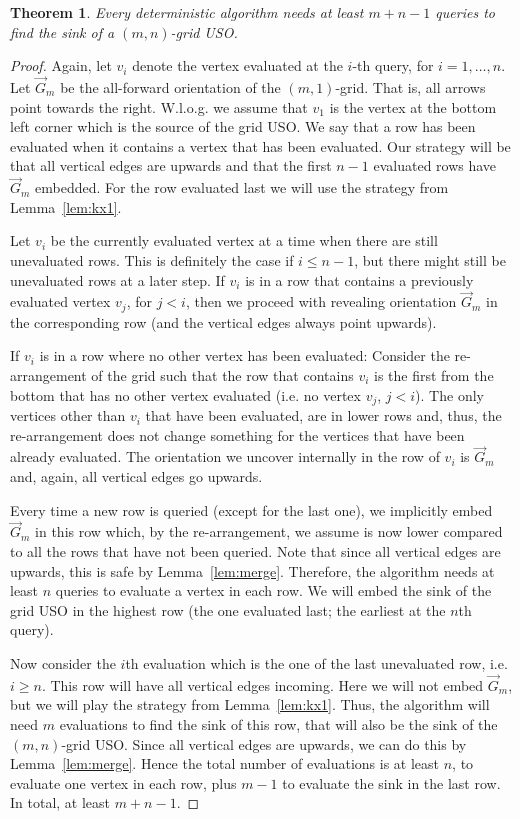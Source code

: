 \documentclass[a4paper,10pt]{article}
\newtheorem{theorem}{Theorem}
\newcommand{\og}{\overrightarrow{G}}
\begin{document}
\begin{theorem} \label{thm:lowerbound}
Every deterministic algorithm needs at least $m+n-1$ queries to find the sink of a $(m,n)$-grid USO. 
\end{theorem}
\begin{proof}
Again, let $v_i$ denote the vertex evaluated at the $i$-th query, for $i=1,\ldots, n$. Let $\og_m$ be the all-forward orientation of the $(m,1)$-grid. 
That is, all arrows point towards the right. 
W.l.o.g. we assume that $v_1$ is the vertex 
at the bottom left corner which is the source of the grid USO. 
We say that a row has been evaluated when it contains a vertex that has been evaluated. 
Our strategy will be that all vertical edges are upwards and that the first $n-1$ evaluated rows 
have $\og_m$ embedded. For the row evaluated last we will use the strategy from Lemma~\ref{lem:kx1}.

Let $v_i$ be the currently evaluated vertex at a time when there are still unevaluated rows. This is definitely the case if $i\leq n-1$, but there might still be
unevaluated rows at a later step. 
If $v_i$ is in a row that contains a previously evaluated vertex $v_j$, for $j < i$, then 
we proceed with revealing orientation $\og_m$ in the corresponding row (and the vertical edges always point upwards). 

If $v_i$ is in a row where no other vertex has been evaluated: Consider the re-arrangement of the grid 
such that the row that contains $v_i$ is the first from the bottom that has no other vertex evaluated (i.e. no vertex $v_j$, $j<i$). 
The only vertices other than $v_i$ that have been evaluated, are in lower rows and, thus, the re-arrangement does not change 
something for the vertices that have been already evaluated.
The orientation we uncover internally in the row of $v_i$ is $\og_m$ and, again, all vertical edges go upwards. 

Every time a new row is queried (except for the last one), 
we implicitly embed $\og_m$ in this row which, by the re-arrangement, we assume is now lower compared to all the rows
that have not been queried.  Note that since all vertical edges are upwards, this is safe by Lemma~\ref{lem:merge}.
Therefore, the algorithm needs at least $n$ queries to evaluate a vertex in each row. We will embed the sink of the grid USO in the highest row (the one 
evaluated last; the earliest at the $n$th query).

Now consider the $i$th evaluation which is the one of the last unevaluated row, i.e. $i \geq n$. This row will have all vertical edges incoming. 
Here we will not embed $\og_m$, but we will play the strategy from Lemma~\ref{lem:kx1}. Thus, the algorithm will need $m$ evaluations to find 
the sink of this row, that will also be the sink of the $(m,n)$-grid USO. Since all vertical edges are upwards, we can do this by Lemma~\ref{lem:merge}. 
Hence the total number of evaluations is at least $n$, to evaluate one vertex in each row, plus $m-1$ to evaluate the sink in the last row.
In total, at least $m+n-1$.
\end{proof}
\end{document}
